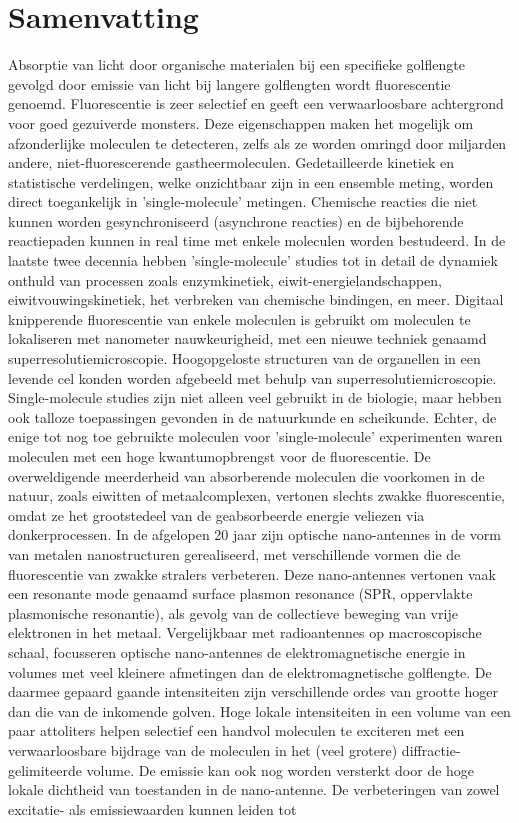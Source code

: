 \chapter*{Samenvatting}
\label{ch:Samenvatting}

Absorptie van licht door organische materialen bij een specifieke golflengte gevolgd door emissie
van licht bij langere golflengten wordt fluorescentie genoemd. Fluorescentie is zeer selectief en geeft een verwaarloosbare achtergrond voor goed gezuiverde monsters. Deze eigenschappen maken het mogelijk om afzonderlijke moleculen te detecteren, zelfs als ze worden omringd door miljarden andere, niet-fluorescerende gastheermoleculen. Gedetailleerde kinetiek en statistische verdelingen, welke onzichtbaar zijn in een ensemble meting, worden direct toegankelijk in ’single-molecule’ metingen. Chemische reacties die niet kunnen worden gesynchroniseerd (asynchrone reacties) en de bijbehorende reactiepaden kunnen in real time met enkele moleculen worden bestudeerd. In de laatste twee decennia hebben ’single-molecule’ studies tot in detail de dynamiek onthuld van processen zoals enzymkinetiek, eiwit-energielandschappen, eiwitvouwingskinetiek, het verbreken van chemische bindingen, en meer. Digitaal knipperende fluorescentie van enkele moleculen is gebruikt om moleculen te lokaliseren met nanometer nauwkeurigheid, met een nieuwe techniek genaamd superresolutiemicroscopie. Hoogopgeloste  structuren van de organellen in een levende cel konden worden afgebeeld met behulp van superresolutiemicroscopie. Single-molecule studies zijn niet alleen veel gebruikt in de biologie, maar hebben ook talloze toepassingen gevonden in de natuurkunde en scheikunde. Echter, de enige tot nog toe gebruikte moleculen voor ’single-molecule’ experimenten waren moleculen met een hoge kwantumopbrengst voor de fluorescentie. De overweldigende meerderheid van absorberende moleculen die voorkomen in de natuur, zoals eiwitten of metaalcomplexen, vertonen slechts zwakke fluorescentie, omdat ze het grootstedeel van de geabsorbeerde energie veliezen via donkerprocessen. In de afgelopen 20 jaar zijn optische nano-antennes in de vorm van metalen nanostructuren gerealiseerd, met verschillende vormen die de fluorescentie van zwakke stralers verbeteren. Deze nano-antennes vertonen vaak een resonante mode genaamd surface plasmon resonance (SPR, oppervlakte plasmonische resonantie), als gevolg van de collectieve beweging van vrije elektronen in het metaal. Vergelijkbaar met radioantennes op macroscopische schaal, focusseren optische nano-antennes de elektromagnetische energie in volumes met veel kleinere afmetingen dan de elektromagnetische golflengte. De daarmee gepaard gaande intensiteiten zijn verschillende ordes van grootte hoger dan die van de inkomende golven. Hoge lokale intensiteiten in een volume van een paar attoliters helpen selectief een handvol moleculen te exciteren met een verwaarloosbare bijdrage van de moleculen in het (veel grotere) diffractie-gelimiteerde volume. De emissie kan ook nog worden versterkt door de hoge lokale dichtheid van toestanden in de nano-antenne. De verbeteringen van zowel excitatie- als emissiewaarden kunnen leiden tot 
